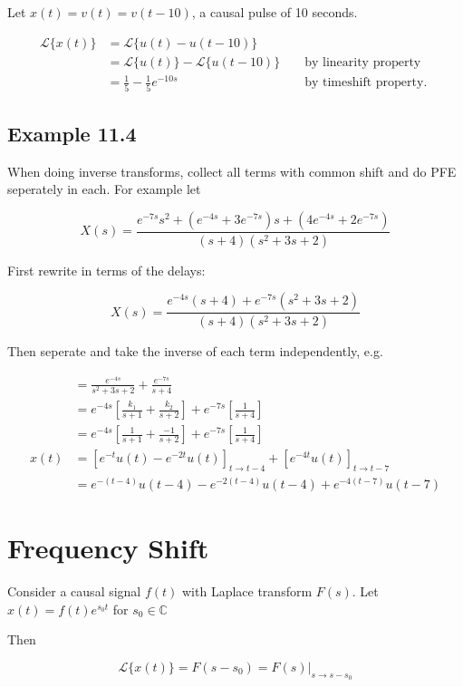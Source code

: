 \documentclass{article}
\begin{document}
Let $x(t)=v(t)=v(t-10)$, a causal pulse of 10 seconds.

$$
\begin{aligned}
\mathcal{L}\{x(t)\} & =\mathcal{L}\{u(t)-u(t-10)\} & & \\
& =\mathcal{L}\{u(t)\}-\mathcal{L}\{u(t-10)\} & & \text { by linearity property } \\
& =\frac{1}{5}-\frac{1}{5} e^{-10s} & & \text { by timeshift property. }
\end{aligned}
$$


\subsection{Example 11.4}

When doing inverse transforms, collect all terms with common shift and do PFE seperately in each. For example let

\[
X(s)=\frac{e^{-7 s} s^2 + \left(e^{-4s} + 3e^{-7s}\right)s + \left(4e^{-4s} + 2e^{-7s} \right)}{(s+4)\left(s^{2}+3 s+2\right)}
\]

First rewrite in terms of the delays:

\[
X(s)=\frac{e^{-4 s}(s+4)+e^{-7 s}\left(s^{2}+3s+2\right)}{(s+4)\left(s^{2}+3 s+2\right)}
\]

Then seperate and take the inverse of each term independently, e.g.

$$
\begin{aligned}
& =\frac{e^{-4 s}}{s^{2}+3s+2}+\frac{e^{-7 s}}{s+4} \\
& =e^{-4 s}\left[\frac{k_{1}}{s+1}+\frac{k_{2}}{s+2}\right]+e^{-7 s}\left[\frac{1}{s+4}\right] \\
& =e^{-4 s}\left[\frac{1}{s+1}+\frac{-1}{s+2}\right]+e^{-7 s}\left[\frac{1}{s+4}\right] \\
x(t) & =\left[e^{-t} u(t)-e^{-2 t} u(t)\right]_{t\rightarrow t-4} + \left[e^{-4 t} u(t)\right]_{t\rightarrow t-7} \\
& =e^{-(t-4)} u(t-4)-e^{-2(t-4)} u(t-4)+e^{-4(t-7)} u(t-7)
\end{aligned}
$$

\section{Frequency Shift}

Consider a causal signal $f(t)$ with Laplace transform $F(s)$. Let $x(t)=f(t) e^{s_{0} t}$ for $s_{0} \in \mathbb{C}$

Then

\[
\mathcal{L}\{x(t)\}=F\left(s-s_{0}\right)=\left.F(s)\right|_{s \rightarrow s-s_{0}}
\]
\end{document}
